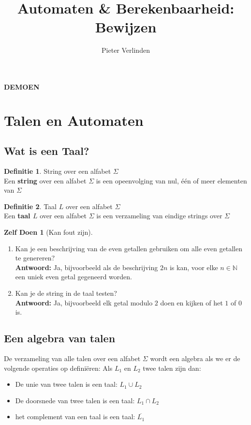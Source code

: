 \documentclass[12pt,a4paper]{article}
\author{Pieter Verlinden}
\title{Automaten \& Berekenbaarheid: Bewijzen}
\theoremstyle{definition}
\newtheorem{defi}{Definitie}[section]
\newtheorem{zDoen}{Zelf Doen}[section]
\begin{document}
\textbf{\LARGE DEMOEN}\\			
		
\section{Talen en Automaten}
	\subsection{Wat is een Taal?}
		\begin{defi}
			String over een alfabet $\Sigma$\\
			Een \textbf{string} over een alfabet $\Sigma$ is een opeenvolging van nul, één of meer elementen van $\Sigma$
		\end{defi}
	\begin{defi}
		Taal $L$ over een alfabet $\Sigma$\\
		Een \textbf{taal $L$} over een alfabet $\Sigma$ is een verzameling van eindige strings over $\Sigma$
	\end{defi}
	
	\begin{zDoen}[Kan fout zijn]
		\begin{enumerate}
			\item Kan je een beschrijving van de even getallen gebruiken om alle even getallen te genereren?\\
			\textbf{Antwoord:} Ja, bijvoorbeeld als de beschrijving $2n$ is kan, voor elke $n \in \mathbb{N}$ een uniek even getal gegeneerd worden.
			\item Kan je de string in de taal testen?\\
			\textbf{Antwoord:} Ja, bijvoorbeeld elk getal modulo $2$ doen en kijken of het $1$ of $0$ is.
		\end{enumerate}
	\end{zDoen}
	
	\subsection{Een algebra van talen}
		De verzameling van alle talen over een alfabet $\Sigma$ wordt een algebra als we er de volgende operaties op definiëren: 
			Als $L_1$ en $L_2$ twee talen zijn dan:
		\begin{itemize}
			\item De unie van twee talen is een taal: $L_1 \cup L_2$
			\item De doorsnede van twee talen is een taal: $L_1 \cap L_2$
			\item het complement van een taal is een taal: $\overline{L_1}$
		\end{itemize}
\end{document}

